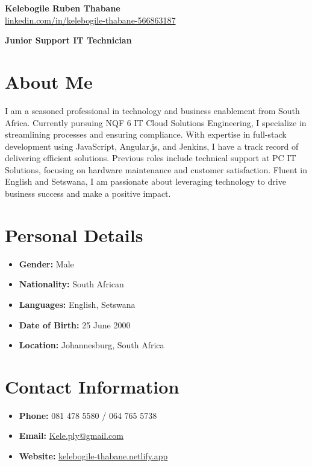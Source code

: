 \documentclass[a4paper,10pt]{article}
\begin{document}
\begin{center}
    {\LARGE \textbf{Kelebogile Ruben Thabane}} \\
    \href{https://www.linkedin.com/in/kelebogile-thabane-566863187}{linkedin.com/in/kelebogile-thabane-566863187}
 \item \textbf{Junior Support IT Technician} 
\end{center}
\space

\section{About Me}
I am a seasoned professional in technology and business enablement from South Africa. Currently pursuing NQF 6 IT Cloud Solutions Engineering, I specialize in streamlining processes and ensuring compliance. With expertise in full-stack development using JavaScript, Angular.js, and Jenkins, I have a track record of delivering efficient solutions. Previous roles include technical support at PC IT Solutions, focusing on hardware maintenance and customer satisfaction. Fluent in English and Setswana, I am passionate about leveraging technology to drive business success and make a positive impact.

\section{Personal Details}
\begin{itemize}
    \item \textbf{Gender:} Male
    \item \textbf{Nationality:} South African
    \item \textbf{Languages:} English, Setswana
    \item \textbf{Date of Birth:} 25 June 2000
    \item \textbf{Location:} Johannesburg, South Africa
\end{itemize}

\section{Contact Information}
\begin{itemize}
    \item \textbf{Phone:} 081 478 5580 / 064 765 5738
    \item \textbf{Email:} \href{mailto:Kele.ply@gmail.com}{Kele.ply@gmail.com}
    \item \textbf{Website:} \href{https://kelebogile-thabane.netlify.app}{kelebogile-thabane.netlify.app}
\end{itemize}
\end{document}

